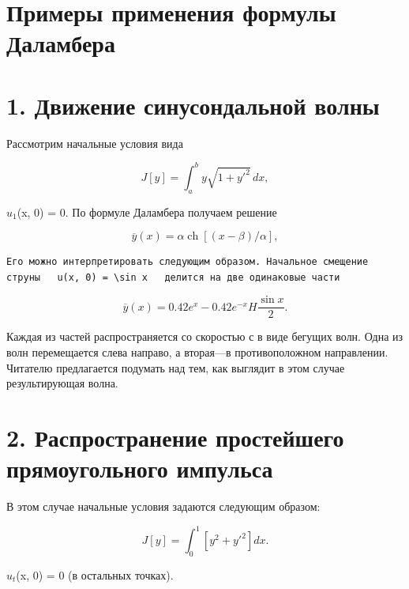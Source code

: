 \documentclass[
  ukrainian,
]{article}
\begin{document}
\section{Примеры применения формулы
Даламбера}\label{ux43fux440ux438ux43cux435ux440ux44b-ux43fux440ux438ux43cux435ux43dux435ux43dux438ux44f-ux444ux43eux440ux43cux443ux43bux44b-ux434ux430ux43bux430ux43cux431ux435ux440ux430}

\section{1. Движение синусондальной
волны}\label{ux434ux432ux438ux436ux435ux43dux438ux435-ux441ux438ux43dux443ux441ux43eux43dux434ux430ux43bux44cux43dux43eux439-ux432ux43eux43bux43dux44b}

Рассмотрим начальные условия вида

\[
J[y] = \int_a^b y \sqrt{1 + y'^2} \, dx,
\]

\(u_1\)(x, 0) = 0. По формуле Даламбера получаем решение

\[
\overline{y}(x) = \alpha \operatorname{ch}[(x-\beta)/\alpha],
\]

\begin{verbatim}
Его можно интерпретировать следующим образом. Начальное смещение струны   u(x, 0) = \sin x   делится на две одинаковые части
\end{verbatim}

\[
\overline{y}(x) = 0.42e^x - 0.42e^{-x}
H   \frac{\sin x}{2}  .
\]

Каждая из частей распространяется со скоростью с в виде бегущих волн.
Одна из волн перемещается слева направо, а вторая---в противоположном
направлении. Читателю предлагается подумать над тем, как выглядит в этом
случае результирующая волна.

\section{2. Распространение простейшего прямоугольного
импульса}\label{ux440ux430ux441ux43fux440ux43eux441ux442ux440ux430ux43dux435ux43dux438ux435-ux43fux440ux43eux441ux442ux435ux439ux448ux435ux433ux43e-ux43fux440ux44fux43cux43eux443ux433ux43eux43bux44cux43dux43eux433ux43e-ux438ux43cux43fux443ux43bux44cux441ux430}

В этом случае начальные условия задаются следующим образом:

\[
J[y] = \int_{0}^{1} [y^{2} + y'^{2}] dx.
\]

\(u_t\)(x, 0) = 0 (в остальных точках).
\end{document}
